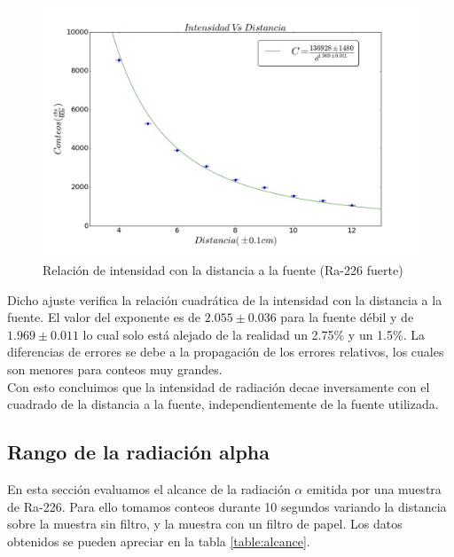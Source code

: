 \documentclass[%
 reprint,
 amsmath,amssymb,
 aps,
]{revtex4-1}
\begin{document}
\begin{figure}[h!]
\centering
\includegraphics[width=1.1\linewidth]{cuadrados.jpg}
\caption{Relación de intensidad con la distancia a la fuente (Ra-226 fuerte)}
\label{fig:cuadrados}
\end{figure}

Dicho ajuste verifica la relación cuadrática de la intensidad con la distancia a la fuente. El valor del exponente es de $2.055\pm0.036$  para la fuente débil y de $1.969\pm0.011$ lo cual solo está alejado de la realidad un 2.75\% y un 1.5\%. La diferencias de errores se debe a la propagación de los errores relativos, los cuales son menores para conteos muy grandes.\\

Con esto concluimos que la intensidad de radiación decae inversamente con el cuadrado de la distancia a la fuente, independientemente de la fuente utilizada.\\
 
\subsection{\label{sec:level2}Rango de la radiación alpha}
En esta sección evaluamos el alcance de la radiación $\alpha$ emitida por una muestra de Ra-226. Para ello tomamos conteos durante 10 segundos variando la distancia sobre la muestra sin filtro, y la muestra con un filtro de papel. Los datos obtenidos se pueden apreciar en la tabla \ref{table:alcance}.\\
\end{document}
